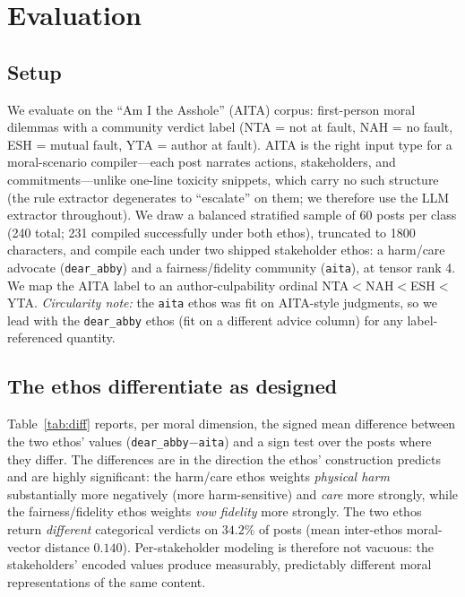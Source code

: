 \documentclass[journal]{IEEEtran}
\begin{document}
\section{Evaluation}
\label{sec:eval}

\subsection{Setup}
We evaluate on the ``Am I the Asshole'' (AITA) corpus: first-person moral
dilemmas with a community verdict label (NTA = not at fault, NAH = no fault,
ESH = mutual fault, YTA = author at fault). AITA is the right input type for a
moral-scenario compiler---each post narrates actions, stakeholders, and
commitments---unlike one-line toxicity snippets, which carry no such structure
(the rule extractor degenerates to ``escalate'' on them; we therefore use the
LLM extractor throughout). We draw a balanced stratified sample of 60 posts per
class (240 total; 231 compiled successfully under both ethos), truncated to 1800
characters, and compile each under two shipped stakeholder ethos: a harm/care
advocate (\texttt{dear\_abby}) and a fairness/fidelity community
(\texttt{aita}), at tensor rank 4. We map the AITA label to an author-culpability
ordinal NTA$<$NAH$<$ESH$<$YTA. \emph{Circularity note:} the \texttt{aita} ethos
was fit on AITA-style judgments, so we lead with the \texttt{dear\_abby} ethos
(fit on a different advice column) for any label-referenced quantity.

\subsection{The ethos differentiate as designed}
Table~\ref{tab:diff} reports, per moral dimension, the signed mean difference
between the two ethos' values (\texttt{dear\_abby}$-$\texttt{aita}) and a sign
test over the posts where they differ. The differences are in the direction the
ethos' construction predicts and are highly significant: the harm/care ethos
weights \emph{physical harm} substantially more negatively (more harm-sensitive)
and \emph{care} more strongly, while the fairness/fidelity ethos weights
\emph{vow fidelity} more strongly. The two ethos return \emph{different}
categorical verdicts on $34.2\%$ of posts (mean inter-ethos moral-vector
distance $0.140$). Per-stakeholder modeling is therefore not vacuous: the
stakeholders' encoded values produce measurably, predictably different moral
representations of the same content.
\end{document}
